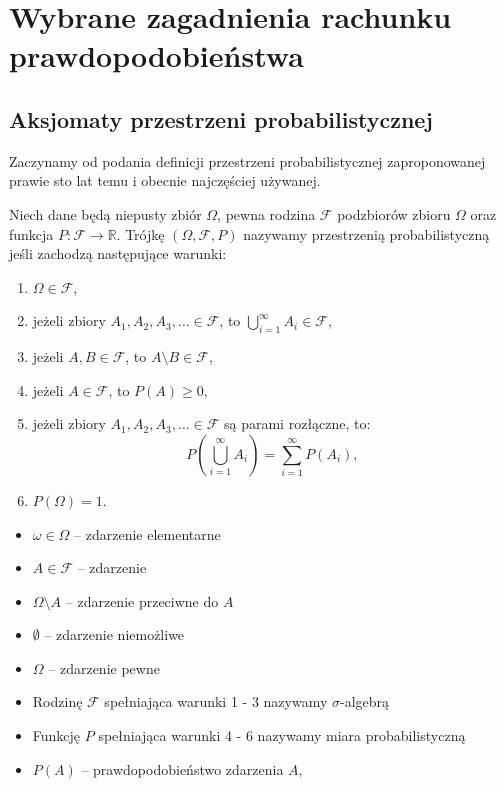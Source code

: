 \documentclass[final,a4paper,openany,12pt]{mwbk}
\begin{document}
\chapter{Wybrane zagadnienia rachunku prawdopodobieństwa}

\section{Aksjomaty przestrzeni probabilistycznej}

Zaczynamy od podania definicji przestrzeni probabilistycznej zaproponowanej prawie sto lat temu i obecnie najczęściej używanej.

\begin{Def}[Kołmogorow]
Niech dane będą niepusty zbiór $\Omega$, pewna rodzina $\mathcal{F}$ podzbiorów zbioru $\Omega$ oraz funkcja $P \colon \mathcal{F} \longrightarrow \mathbb{R}$. Trójkę $(\Omega, \mathcal{F}, P)$ nazywamy przestrzenią probabilistyczną jeśli zachodzą następujące warunki:
\begin{enumerate}
    \item $\Omega \in \mathcal{F}$,
    \item jeżeli zbiory $A_1, A_2, A_3, \dots \in \mathcal{F}$, to $\bigcup_{i=1}^{\infty} A_i \in \mathcal{F}$,
    \item jeżeli $A, B \in \mathcal{F}$, to $A \setminus B \in \mathcal{F}$,
    \item jeżeli $A \in \mathcal{F}$, to $P(A) \ge 0$,
    \item jeżeli zbiory $A_1, A_2, A_3, \dots \in \mathcal{F}$ są parami rozłączne, to:
    \[ P\left(\bigcup_{i=1}^{\infty} A_i\right) = \sum_{i=1}^{\infty} P(A_i), \]
    \item $P(\Omega) = 1$.
\end{enumerate}
\end{Def}


\begin{itemize}
    \item $\omega \in \Omega$ – zdarzenie elementarne
    \item $A \in \mathcal{F}$ – zdarzenie
    \item $\Omega \setminus A$ – zdarzenie przeciwne do $A$
    \item $\emptyset$ – zdarzenie niemożliwe
    \item $\Omega$ – zdarzenie pewne
    \item Rodzinę $\mathcal{F}$ spełniająca warunki 1 - 3 nazywamy $\sigma$-algebrą
    \item Funkcję $P$ spełniająca warunki 4 - 6 nazywamy miara probabilistyczną
    \item $P(A)$ – prawdopodobieństwo zdarzenia $A$,
\end{itemize}
\end{document}
